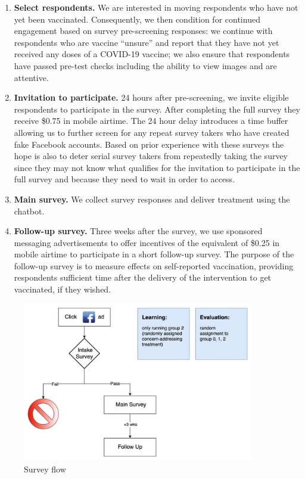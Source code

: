 \documentclass[letterpaper, 12pt, parskip=full,DIV=10]{scrartcl}
\begin{document}
\begin{enumerate}
\item \textbf{Select respondents.} We are interested in moving respondents who have not yet been vaccinated. Consequently, we then condition for continued engagement based on survey pre-screening responses: we continue with respondents who are vaccine ``unsure'' and report that they have not yet received any doses of a COVID-19 vaccine; we also ensure that respondents have passed pre-test checks including the ability to view images and are attentive. 

\item \textbf{Invitation to participate.} 24 hours after pre-screening, we invite eligible respondents to participate in the survey. After completing the full survey they receive \$0.75 in mobile airtime. The 24 hour delay introduces a time buffer allowing us to further screen for any repeat survey takers who have created fake Facebook accounts. Based on prior experience with these surveys the hope is also to deter serial survey takers from repeatedly taking the survey since they may not know what qualifies for the invitation to participate in the full survey and because they need to wait in order to access. 

\item \textbf{Main survey.} We collect survey responses and deliver treatment using the chatbot. 

\item \textbf{Follow-up survey.} Three weeks after the survey, we use sponsored messaging advertisements to offer incentives of the equivalent of \$0.25 in mobile airtime to participate in a short follow-up survey. The purpose of the follow-up survey is to measure effects on self-reported vaccination, providing respondents sufficient time after the delivery of the intervention to get vaccinated, if they wished.

\end{enumerate}

\begin{figure}[h!]
   \centering
   \includegraphics[width = 0.9\textwidth]{../../tables-figures/vcf_survey_flow.jpg} 
   \caption{Survey flow}
   \label{fig:surveyflow}
\end{figure}
\end{document}
